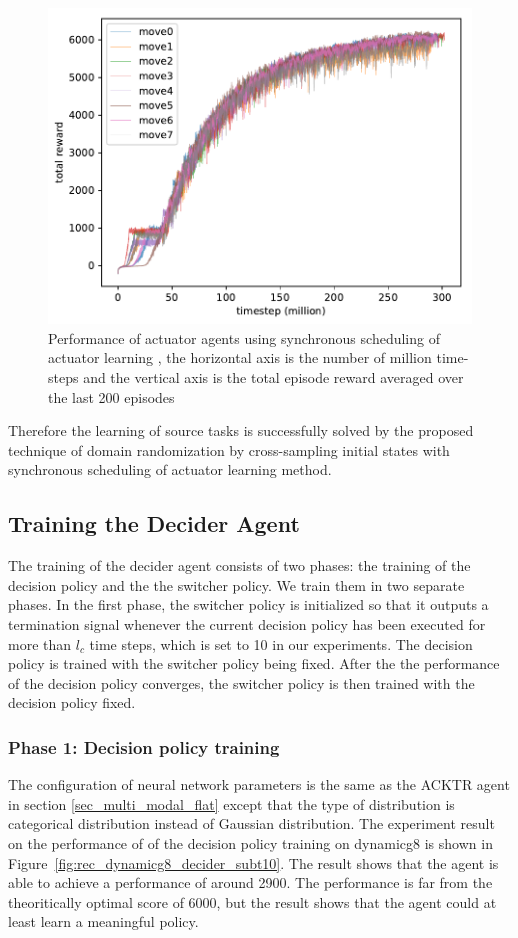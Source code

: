 \begin{figure}[!htbp]
	\includegraphics[width=\textwidth]{images/rec_180619_sync.pdf}
	\centering
	\caption{Performance of actuator agents using synchronous scheduling of actuator learning , the horizontal axis is the number of million time-steps and the vertical axis is the total episode reward averaged over the last 200 episodes}\label{rec_sync_training}
\end{figure}

Therefore the learning of source tasks is successfully solved by the proposed technique of domain randomization by cross-sampling initial states with synchronous scheduling of actuator learning method.
\subsection{Training the Decider Agent}
The training of the decider agent consists of two phases: the training of the decision policy and the the switcher policy. We train them in two separate phases. In the first phase, the switcher policy is initialized so that it outputs a termination signal whenever the current decision policy has been executed for more than $l_c$ time steps, which is set to 10 in our experiments. The decision policy is trained with the switcher policy being fixed. After the the performance of the decision policy converges, the switcher policy is then trained with the decision policy fixed.

\subsubsection{Phase 1: Decision policy training}
The configuration of neural network parameters is the same as the ACKTR agent in section \ref{sec_multi_modal_flat} except that the type of distribution is categorical distribution instead of Gaussian distribution.
The experiment result on the performance of of the decision policy training on dynamicg8 is shown in Figure~\ref{fig:rec_dynamicg8_decider_subt10}. The result shows that the agent is able to achieve a performance of around 2900. The performance is far from the theoritically optimal score of 6000, but the result shows that the agent could at least learn a meaningful policy.

